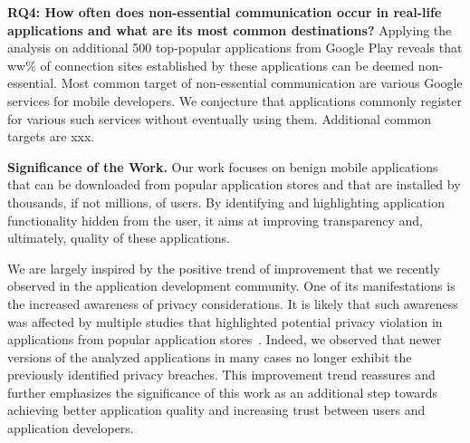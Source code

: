 \vspace{0.1in}
\noindent 
{\bf RQ4: How often does non-essential communication occur in real-life applications and what are its most common destinations?}
Applying the analysis on additional 500 top-popular applications from Google Play reveals that ww\% of connection sites established by these applications can be deemed non-essential.
Most common target of non-essential communication are various Google services for mobile developers. We conjecture 
that applications commonly register for various such services without eventually using them. 
Additional common targets are xxx.

\vspace{0.1in}
\noindent 
{\bf Significance of the Work.}
Our work focuses on benign  mobile applications that can be downloaded from popular application stores and that are installed by thousands, if not millions, of users.
By identifying and highlighting application functionality hidden from the user, it aims at improving transparency and, ultimately, quality of these applications. 
 
We are largely inspired by the positive trend of improvement that we recently observed in the application development community.
One of its manifestations is the increased awareness of privacy considerations. It is likely that such awareness was affected by multiple studies that highlighted
potential privacy violation in applications from popular application stores~\cite{Enck:Gilbert:Chun:Cox:Jung:McDaniel:Sheth:OSDI10, Egele:Kruegel:Kirda:Vign:NDSS11,Tripp:Rubin:SEC14}.
Indeed, we observed that newer versions of the analyzed applications in many cases no longer exhibit the previously identified privacy breaches.  
This improvement trend reassures and further emphasizes the significance of this work as an additional step towards achieving better application quality and increasing trust between users and application developers. 





